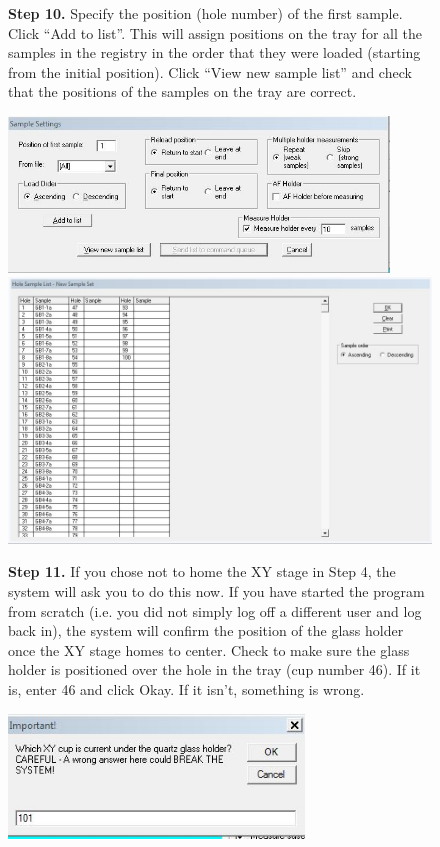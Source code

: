 \documentclass[11pt,letterpaper]{article}
\begin{document}
\begin{figure}
\begin{flushleft}
\textbf{Step 10.}
Specify the position (hole number) of the first sample. Click ``Add to list''. This will assign positions on the tray for all the samples in the registry in the order that they were loaded (starting from the initial position). Click ``View new sample list'' and check that the positions of the samples on the tray are correct. 
\end{flushleft}
\centering
\includegraphics[width=0.9\textwidth]{images/Capture10.jpg}
\includegraphics[width=\textwidth]{images/Capture11.jpg}
\end{figure}

\begin{figure}
\begin{flushleft}
\textbf{Step 11.}
If you chose not to home the XY stage in Step 4, the system will ask you to do this now. If you have started the program from scratch (i.e. you did not simply log off a different user and log back in), the system will confirm the position of the glass holder once the XY stage homes to center. Check to make sure the glass holder is positioned over the hole in the tray (cup number 46). If it is, enter 46 and click Okay. If it isn't, something is wrong. 
\end{flushleft}
\centering
\includegraphics[width=0.7\textwidth]{images/Capture12.jpg}
\end{figure}
\end{document}
